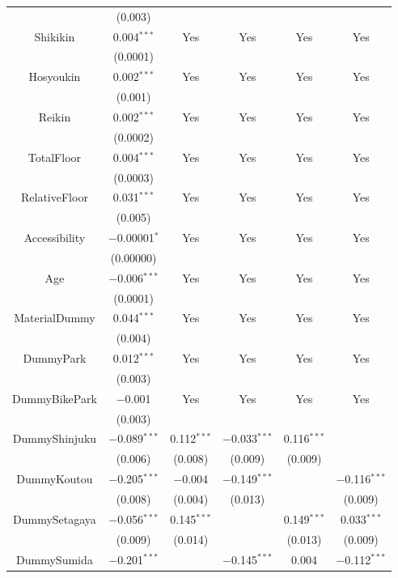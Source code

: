 \documentclass[a4paper, 12pt]{article} %
\begin{document}
\begin{longtable}[c]{cccccc}
& (0.003) & & & & \\
\addlinespace[0.5em]
Shikikin & 0.004$^{***}$ & Yes & Yes & Yes & Yes \\
& (0.0001) & & & & \\
\addlinespace[0.5em]
Hosyoukin & 0.002$^{***}$ & Yes & Yes & Yes & Yes \\
& (0.001) & & & & \\
\addlinespace[0.5em]
Reikin & 0.002$^{***}$ & Yes & Yes & Yes & Yes \\
& (0.0002) & & & & \\
\addlinespace[0.5em]
TotalFloor & 0.004$^{***}$ & Yes & Yes & Yes & Yes \\
& (0.0003) & & & & \\
\addlinespace[0.5em]
RelativeFloor & 0.031$^{***}$ & Yes & Yes & Yes & Yes \\
& (0.005) & & & & \\
\addlinespace[0.5em]
Accessibility & $-$0.00001$^{*}$ & Yes & Yes & Yes & Yes \\
& (0.00000) & & & & \\
\addlinespace[0.5em]
Age & $-$0.006$^{***}$ & Yes & Yes & Yes & Yes \\
& (0.0001) & & & & \\
\addlinespace[0.5em]
MaterialDummy & 0.044$^{***}$ & Yes & Yes & Yes & Yes \\
& (0.004) & & & & \\
\addlinespace[0.5em]
DummyPark & 0.012$^{***}$ & Yes & Yes & Yes & Yes \\
& (0.003) & & & & \\
\addlinespace[0.5em]
DummyBikePark & $-$0.001 & Yes & Yes & Yes & Yes \\
& (0.003) & & & & \\
\addlinespace[0.5em]
DummyShinjuku & $-$0.089$^{***}$ & 0.112$^{***}$ & $-$0.033$^{***}$ & 0.116$^{***}$ & \\
& (0.006) & (0.008) & (0.009) & (0.009) & \\
\addlinespace[0.5em]
DummyKoutou & $-$0.205$^{***}$ & $-$0.004 & $-$0.149$^{***}$ & & $-$0.116$^{***}$ \\
& (0.008) & (0.004) & (0.013) & & (0.009) \\
\addlinespace[0.5em]
DummySetagaya & $-$0.056$^{***}$ & 0.145$^{***}$ & & 0.149$^{***}$ & 0.033$^{***}$ \\
& (0.009) & (0.014) & & (0.013) & (0.009) \\
\addlinespace[0.5em]
DummySumida & $-$0.201$^{***}$ & & $-$0.145$^{***}$ & 0.004 & $-$0.112$^{***}$ \\

\end{longtable}
\end{document}
